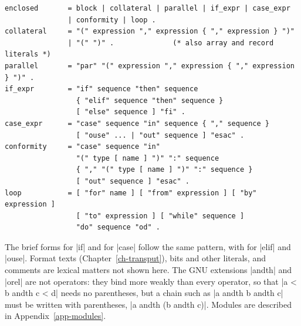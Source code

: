 \begin{lstlisting}[language={},basicstyle=\ttfamily\footnotesize]
enclosed       = block | collateral | parallel | if_expr | case_expr
               | conformity | loop .
collateral     = "(" expression "," expression { "," expression } ")"
               | "(" ")" .              (* also array and record literals *)
parallel       = "par" "(" expression "," expression { "," expression } ")" .
if_expr        = "if" sequence "then" sequence
                 { "elif" sequence "then" sequence }
                 [ "else" sequence ] "fi" .
case_expr      = "case" sequence "in" sequence { "," sequence }
                 [ "ouse" ... | "out" sequence ] "esac" .
conformity     = "case" sequence "in"
                 "(" type [ name ] ")" ":" sequence
                 { "," "(" type [ name ] ")" ":" sequence }
                 [ "out" sequence ] "esac" .
loop           = [ "for" name ] [ "from" expression ] [ "by" expression ]
                 [ "to" expression ] [ "while" sequence ]
                 "do" sequence "od" .
\end{lstlisting}

The brief forms  for \code|if| and
 for \code|case| follow the same pattern, with
\code{|:} for \code|elif| and \code|ouse|. Format texts (Chapter~\ref{ch-transput}),
bits and other literals, and comments are lexical matters not shown here.
The GNU extensions \code|andth| and \code|orel| are not operators: they
bind more weakly than every operator, so that \code|a < b andth c < d|
needs no parentheses, but a chain such as \code|a andth b andth c| must
be written with parentheses, \code|a andth (b andth c)|. Modules are
described in Appendix~\ref{app-modules}.
